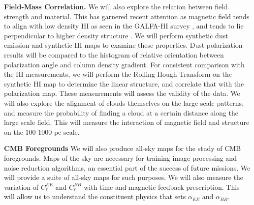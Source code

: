 \noindent
{\bf Field-Mass Correlation.}
We will also explore the relation between field strength and material.  This has
garnered recent attention as magnetic field tends to align with low density HI
as seen in the GALFA-HI survey  \citep{Clark14}, and tends to lie perpendicular
to higher density structure \citep{PlanckXXXII14}.  We will perform synthetic dust
emission and synthetic HI maps to examine these properties.  Dust polarization
results will be compared to the histogram of relative orientation between
polarization angle and column density gradient. For consistent comparison with
the HI measurements, we will perform the Rolling Hough Transform \citep{Clark14} on the
synthetic HI map to determine the linear structure, and correlate that with the
polarization map.  These measurements will assess the validity of the data.  We
will also explore the alignment of clouds themselves on the large scale
patterns, and measure the probability of finding a cloud at a certain distance
along the large scale field.  This will measure the interaction of magnetic
field and structure on the 100-1000 pc scale.

\noindent
{\bf CMB Foregrounds}
We will also produce all-sky maps for the study of CMB foregrounds.  Maps of the
sky are necessary for training image processing and noise reduction algorithms,
an essential part of the success of future missions.  We will provide a suite of
all-sky maps for such purposes.  We will also measure the variation of
$C_\ell^{EE}$  and $C_\ell^{BB}$ with time and magnetic feedback prescription.
This will allow us to understand the constituent physics that sets $\alpha_{EE}$
and $\alpha_{BB}$.





